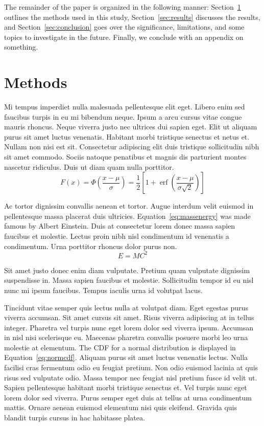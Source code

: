 \documentclass[12pt, letterpaper]{article}
\begin{document}
The remainder of the paper is organized in the following manner:
Section~\ref{sec:methods} outlines the methods used in this study, 
Section~\ref{sec:results} discusses the results, 
and Section~\ref{sec:conclusion} goes over the significance, limitations, and
some topics to investigate in the future. Finally, we conclude with an appendix
on something.


\section{Methods}
\label{sec:methods}

Mi tempus imperdiet nulla malesuada pellentesque elit eget. Libero enim sed 
faucibus turpis in eu mi bibendum neque. Ipsum a arcu cursus vitae congue mauris 
rhoncus. Neque viverra justo nec ultrices dui sapien eget. Elit ut aliquam purus 
sit amet luctus venenatis. Habitant morbi tristique senectus et netus et. Nullam 
non nisi est sit. Consectetur adipiscing elit duis tristique sollicitudin nibh 
sit amet commodo. Sociis natoque penatibus et magnis dis parturient montes 
nascetur ridiculus. Duis ut diam quam nulla porttitor. 
\begin{equation}
\label{eq:normcdf}
{\displaystyle F(x) = \Phi ({\frac {x-\mu }{\sigma }})={\frac {1}{2}}\left[1+\operatorname {erf} \left({\frac {x-\mu }{\sigma {\sqrt {2}}}}\right)\right]}
\end{equation}

Ac tortor dignissim 
convallis aenean et tortor. Augue interdum velit euismod in pellentesque massa 
placerat duis ultricies. Equation~\ref{eq:massenergy} was made famous by Albert
Einstein. Duis at consectetur lorem donec massa sapien faucibus 
et molestie. Lectus proin nibh nisl condimentum id venenatis a condimentum. 
Urna porttitor rhoncus dolor purus non. 
\begin{equation}
\label{eq:massenergy}
E=MC^2
\end{equation}

Sit amet justo donec enim diam 
vulputate. Pretium quam vulputate dignissim suspendisse in. Massa sapien 
faucibus et molestie. Sollicitudin tempor id eu nisl nunc mi ipsum faucibus. 
Tempus iaculis urna id volutpat lacus.


Tincidunt vitae semper quis lectus nulla at volutpat diam. Eget egestas purus 
viverra accumsan. Sit amet cursus sit amet. Risus viverra adipiscing at in 
tellus integer. Pharetra vel turpis nunc eget lorem dolor sed viverra ipsum. 
Accumsan in nisl nisi scelerisque eu. Maecenas pharetra convallis posuere morbi 
leo urna molestie at elementum. The CDF for a normal distribution is displayed 
in Equation~\ref{eq:normcdf}. Aliquam purus sit amet luctus venenatis lectus. 
Nulla facilisi cras fermentum odio eu feugiat pretium. Non odio euismod lacinia 
at quis risus sed vulputate odio. Massa tempor nec feugiat nisl pretium fusce id 
velit ut. Sapien pellentesque habitant morbi tristique senectus et. Vel turpis 
nunc eget lorem dolor sed viverra. Purus semper eget duis at tellus at urna 
condimentum mattis. Ornare aenean euismod elementum nisi quis eleifend. Gravida 
quis blandit turpis cursus in hac habitasse platea.
\end{document}
